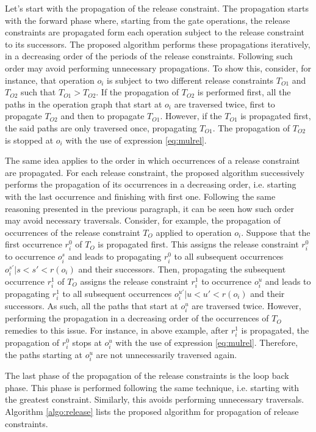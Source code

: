 Let's start with the propagation of the release constraint. The propagation starts with the forward phase where, starting from the gate operations, the release constraints are propagated form each operation subject to the release constraint to its successors. The proposed algorithm performs these propagations iteratively, in a decreasing order of the periods of the release constraints. Following such order may avoid performing unnecessary propagations. To show this, consider, for instance, that operation $o_i$ is subject to two different release constraints $T_{O1}$ and $T_{O2}$ such that $T_{O1} > T_{O2}$. If the propagation of $T_{O2}$ is performed first, all the paths in the operation graph that start at $o_i$ are traversed twice, first to propagate $T_{O2}$ and then to propagate $T_{O1}$. However, if the $T_{O1}$ is propagated first, the said paths are only traversed once, propagating $T_{O1}$. The propagation of $T_{O2}$ is stopped at $o_i$ with the use of expression \ref{eq:mulrel}.

The same idea applies to the order in which occurrences of a release constraint are propagated. For each release constraint, the proposed algorithm successively performs the propagation of its occurrences in a decreasing order, i.e. starting with the last occurrence and finishing with first one. Following the same reasoning presented in the previous paragraph, it can be seen how such order may avoid necessary traversals. Consider, for example, the propagation of occurrences of the release constraint $T_O$ applied to operation $o_i$. Suppose that the first occurrence $r_i^0$ of $T_O$ is propagated first. This assigns the release constraint $r_i^0$ to occurrence $o_i^s$ and leads to propagating $r_i^0$ to all subsequent occurrences $o_i^{s'} | s < s' < r(o_i) $ and their successors. Then, propagating the subsequent occurrence $r_i^1$ of $T_O$ assigns the release constraint $r_i^1$ to occurrence $o_i^u$ and leads to propagating $r_i^1$ to all subsequent occurrences $o_i^{u'} | u < u' < r(o_i) $ and their successors. As such, all the paths that start at $o_i^{u}$ are traversed twice. However, performing the propagation in a decreasing order of the occurrences of $T_O$ remedies to this issue. For instance, in above example, after $r_i^1$ is propagated, the propagation of $r_i^0$ stops at $o_i^{u}$ with the use of expression \ref{eq:mulrel}. Therefore, the paths starting at $o_i^{u}$ are not unnecessarily traversed again.

The last phase of the propagation of the release constraints is the loop back phase. This phase is performed following the same technique, i.e. starting with the greatest constraint. Similarly, this avoids performing unnecessary traversals. Algorithm \ref{algo:release} lists the proposed algorithm for propagation of release constraints.


